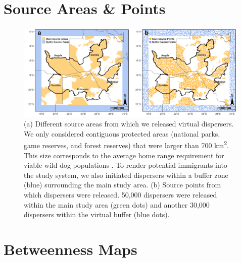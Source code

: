 \documentclass[../FinalThesis.tex]{subfiles}
\begin{document}
\newpage
\section{Source Areas \& Points}

\begin{figure}[!ht]
 \begin{center}
  \includegraphics[width = \textwidth]{Figures/SourceAreas.png} \caption{(a)
  Different source areas from which we released virtual dispersers. We only
  considered contiguous protected areas (national parks, game reserves, and
  forest reserves) that were larger than 700 km\textsuperscript{2}. This size
  corresponds to the average home range requirement for viable wild dog
  populations \citep{Pomilia.2015}. To render potential immigrants into the
  study system, we also initiated dispersers within a buffer zone (blue)
  surrounding the main study area. (b) Source points from which dispersers were
  released. 50,000 dispersers were released within the main study area (green
  dots) and another 30,000 dispersers within the virtual buffer (blue dots).}
  \label{SourcePoints}
 \end{center}
\end{figure}

\newpage
\section{Betweenness Maps}
\label{BetweennessApproaches}
\end{document}
